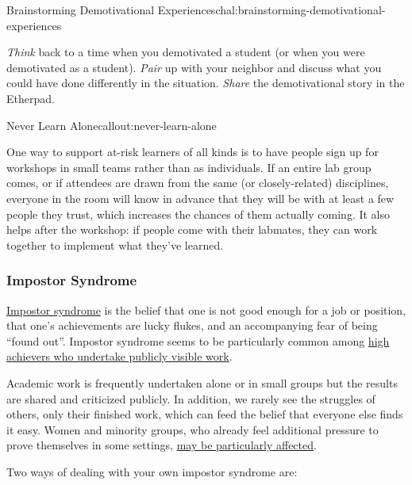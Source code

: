\begin{challenge}{Brainstorming Demotivational Experiences}{chal:brainstorming-demotivational-experiences}

\emph{Think} back to a time when you demotivated a student (or when you
were demotivated as a student). \emph{Pair} up with your neighbor and
discuss what you could have done differently in the situation.
\emph{Share} the demotivational story in the Etherpad.
\end{challenge}

\begin{callout}{Never Learn Alone}{callout:never-learn-alone}

One way to support at-risk learners of all kinds is to have people sign
up for workshops in small teams rather than as individuals. If an entire
lab group comes, or if attendees are drawn from the same (or
closely-related) disciplines, everyone in the room will know in advance
that they will be with at least a few people they trust, which increases
the chances of them actually coming. It also helps after the workshop:
if people come with their labmates, they can work together to implement
what they've learned.
\end{callout}

\subsubsection{Impostor Syndrome}\label{impostor-syndrome}

\href{https://en.wikipedia.org/wiki/Impostor\_syndrome}{Impostor
syndrome} is the belief that one is not good enough for a job or
position, that one's achievements are lucky flukes, and an accompanying
fear of being ``found out''. Impostor syndrome seems to be particularly
common among
\href{https://www.usenix.org/blog/impostor-syndrome-proof-yourself-and-your-community}{high
achievers who undertake publicly visible work}.

Academic work is frequently undertaken alone or in small groups but the
results are shared and criticized publicly. In addition, we rarely see
the struggles of others, only their finished work, which can feed the
belief that everyone else finds it easy. Women and minority groups, who
already feel additional pressure to prove themselves in some settings,
\href{http://www.paulineroseclance.com/pdf/ip\_high\_achieving\_women.pdf}{may
be particularly affected}.

Two ways of dealing with your own impostor syndrome are:


